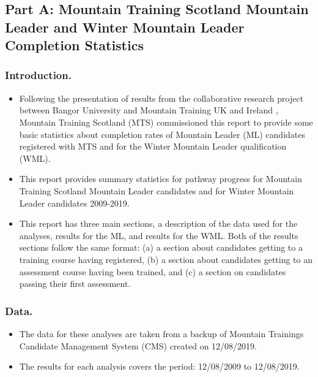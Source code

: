 \documentclass[
  12pt,
  a4paper,
]{book}
\providecommand{\tightlist}{%
  \setlength{\itemsep}{0pt}\setlength{\parskip}{0pt}}
\begin{document}
\hypertarget{impact-mts-a}{%
\subsection{Part A: Mountain Training Scotland Mountain Leader and Winter Mountain Leader Completion Statistics}\label{impact-mts-a}}

\hypertarget{mts-part-a-intro}{%
\subsubsection{Introduction.}\label{mts-part-a-intro}}

\begin{itemize}
\tightlist
\item
  Following the presentation of results from the collaborative research project between Bangor University and Mountain Training UK and Ireland \citep{Hardy2019b}, Mountain Training Scotland (MTS) commissioned this report to provide some basic statistics about completion rates of Mountain Leader (ML) candidates registered with MTS and for the Winter Mountain Leader qualification (WML).
\item
  This report provides summary statistics for pathway progress for Mountain Training Scotland Mountain Leader candidates and for Winter Mountain Leader candidates 2009-2019.
\item
  This report has three main sections, a description of the data used for the analyses, results for the ML, and results for the WML. Both of the results sections follow the same format: (a) a section about candidates getting to a training course having registered, (b) a section about candidates getting to an assessment course having been trained, and (c) a section on candidates passing their first assessment.
\end{itemize}

\hypertarget{mts-part-a-data}{%
\subsubsection{Data.}\label{mts-part-a-data}}

\begin{itemize}
\tightlist
\item
  The data for these analyses are taken from a backup of Mountain Trainings Candidate Management System (CMS) created on 12/08/2019.
\item
  The results for each analysis covers the period: 12/08/2009 to 12/08/2019.
\end{itemize}
\end{document}
